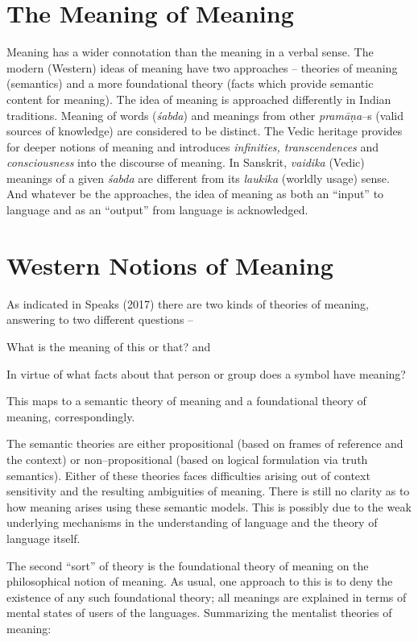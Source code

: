 \section*{The Meaning of Meaning}

Meaning has a wider connotation than the meaning in a verbal sense. The modern (Western) ideas of meaning have two approaches – theories of meaning (semantics) and a more foundational theory (facts which provide semantic content for meaning). The idea of meaning is approached differently in Indian traditions. Meaning of words (\textit{śabda}) and meanings from other \textit{pramāṇa}–s (valid sources of knowledge) are considered to be distinct. The Vedic heritage provides for deeper notions of meaning and introduces \textit{infinities, transcendences} and \textit{consciousness} into the discourse of meaning. In Sanskrit, \textit{vaidika} (Vedic) meanings of a given \textit{śabda} are different from its \textit{laukika} (worldly usage) sense. And whatever be the approaches, the idea of meaning as both an “input” to language and as an “output” from language is acknowledged.


\section*{Western Notions of Meaning}

As indicated in Speaks (2017) there are two kinds of theories of meaning, answering to two different questions –

\item What is the meaning of this or that? and

 \item In virtue of what facts about that person or group does a symbol have meaning?

This maps to a semantic theory of meaning and a foundational theory of meaning, correspondingly.

The semantic theories are either propositional (based on frames of reference and the context) or non–propositional (based on logical formulation via truth semantics). Either of these theories faces difficulties arising out of context sensitivity and the resulting ambiguities of meaning. There is still no clarity as to how meaning arises using these semantic models. This is possibly due to the weak underlying mechanisms in the understanding of language and the theory of language itself.

The second “sort” of theory is the foundational theory of meaning on the philosophical notion of meaning. As usual, one approach to this is to deny the existence of any such foundational theory; all meanings are explained in terms of mental states of users of the languages. Summarizing the mentalist theories of meaning:

